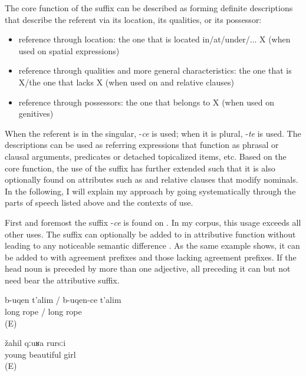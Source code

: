 The core function of the suffix can be described as forming definite descriptions that describe the referent via its location, its qualities, or its possessor:

\begin{itemize}
\item reference through location: the one that is located in/at/under/... X (when used on spatial expressions)
\item reference through qualities and more general characteristics: the one that is X\slash the one that lacks X (when used on  and relative clauses)
\item reference through possessors: the one that belongs to X (when used on genitives)
\end{itemize}

When the referent is in the singular, -\textit{ce} is used; when it is plural, -\textit{te} is used. The descriptions can be used as referring expressions that function as phrasal or clausal arguments, predicates or detached topicalized items, etc. Based on the core function, the use of the suffix has further extended such that it is also optionally found on attributes such as  and relative clauses that modify nominals. In the following, I will explain my approach by going systematically through the parts of speech listed above and the contexts of use.

First and foremost the suffix -\textit{ce} is found on . In my corpus, this usage exceeds all other uses. The suffix can optionally be added to  in attributive function without leading to any noticeable semantic difference . As the same example shows, it can be added to  with  agreement prefixes and those lacking  agreement prefixes. If the head noun is preceded by more than one adjective, all  preceding it can but not need bear the attributive suffix.

\begin{exe}
	\ex	\label{ex:a long rope minor}
	\gll	b-uqen	t'alim	/	b-uqen-ce	t'alim\\
		long	rope		/	long	rope\\
	\glt	{} (E)

	\ex	\label{ex:‎‎a young, beautiful girl minor}
	\gll	žahil	qːuʁa	rursːi\\
		young	beautiful	girl\\
	\glt	{} (E)

	\ex	\label{ex:‎‎a young, beautiful girl minor second}
	\begin{xlist}
		\ex	{}		\label{ex:‎‎a young, beautiful girl minor@A}
		\ex	{}	\label{ex:‎‎a young, beautiful girl minor@B}
		\ex	{}	\label{ex:‎‎a young, beautiful girl minor@C}
	\end{xlist}
\end{exe}

